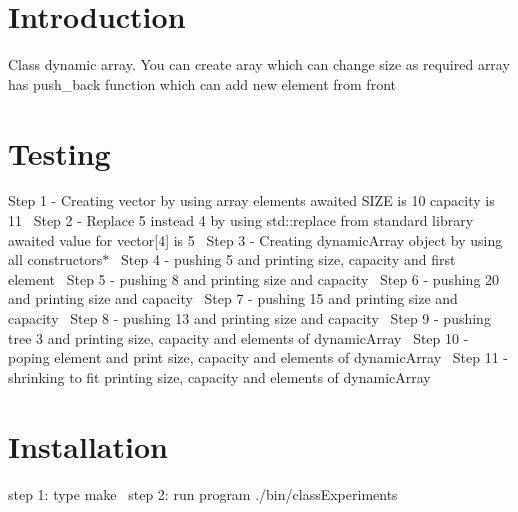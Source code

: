 \hypertarget{index_Introduction}{}\section{Introduction}\label{index_Introduction}
Class dynamic array. You can create aray which can change size as required array has push\+\_\+back function which can add new element from front\hypertarget{index_Testing}{}\section{Testing}\label{index_Testing}
Step 1 -\/ Creating vector by using array elements awaited S\+I\+ZE is 10 capacity is 11~\newline
Step 2 -\/ Replace 5 instead 4 by using std\+::replace from standard library awaited value for vector\mbox{[}4\mbox{]} is 5~\newline
Step 3 -\/ Creating dynamic\+Array object by using all constructors$\ast$~\newline
Step 4 -\/ pushing 5 and printing size, capacity and first element~\newline
Step 5 -\/ pushing 8 and printing size and capacity~\newline
Step 6 -\/ pushing 20 and printing size and capacity~\newline
Step 7 -\/ pushing 15 and printing size and capacity~\newline
Step 8 -\/ pushing 13 and printing size and capacity~\newline
Step 9 -\/ pushing tree 3 and printing size, capacity and elements of dynamic\+Array~\newline
Step 10 -\/ poping element and print size, capacity and elements of dynamic\+Array~\newline
Step 11 -\/ shrinking to fit printing size, capacity and elements of dynamic\+Array~\newline
 \hypertarget{index_Installation}{}\section{Installation}\label{index_Installation}
step 1\+: type make~\newline
step 2\+: run program ./bin/class\+Experiments 